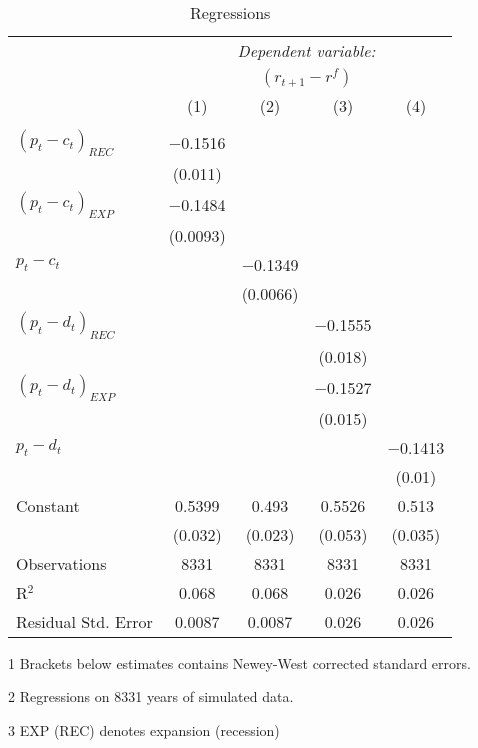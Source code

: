 \begin{table}[H]
\centering   
  \caption{Regressions}           
  \label{tab:regress}     
  \begin{threeparttable}
\begin{tabular}{@{\hspace{5pt}}l@{\hspace{5pt}}cccc} 
\toprule 
 & \multicolumn{4}{c}{\textit{Dependent variable:}} \\ 
 & \multicolumn{4}{c}{$\left(r_{t+1}-r^f\right)$} \\ 
 \cmidrule(rr){2-5}
 & (1)   &   (2) &   (3) &  (4)\\ 
\midrule  
\\[-2.1ex] $\left( p_t - c_t \right)_{REC}$ & $-$0.1516& &  \\ 
  & (0.011) & & & \\ 
 \addlinespace 
  $\left( p_t - c_t \right)_{EXP}$ & $-$0.1484 & &  \\ 
  & (0.0093) & & &\\ 
 \addlinespace 
 $p_t - c_t$ &  & $-$0.1349 & & \\
 & & (0.0066) \\
 \addlinespace 
  $\left( p_t - d_t \right)_{REC}$ & & & $-$0.1555&  \\ 
  & & & (0.018)    &\\ 
 \addlinespace 
  $\left( p_t - d_t \right)_{EXP}$ & & & $-$0.1527&  \\ 
  &  & & (0.015) &\\ 
 \addlinespace 
 $p_t - d_t$ & & & & $-$0.1413 \\
 & & & &  (0.01)  \\
 \addlinespace 
 Constant &0.5399 &0.493 &0.5526 &0.513 \\ 
  &(0.032) &(0.023) &(0.053) &(0.035) \\ 
 \addlinespace 
\midrule  
Observations & 8331 & 8331 & 8331 &8331\\ 
R$^{2}$ &0.068 & 0.068 & 0.026 &0.026\\ 
Residual Std. Error &0.0087 & 0.0087 &0.026 & 0.026  \\ 
\bottomrule 
\end{tabular} 
\begin{tablenotes}
\footnotesize{
\item[1] Brackets below estimates contains Newey-West corrected standard errors. 
\item[2] Regressions on 8331 years of simulated data.
\item[3] EXP (REC) denotes expansion (recession)
}
\end{tablenotes}
\end{threeparttable}
\end{table} 
